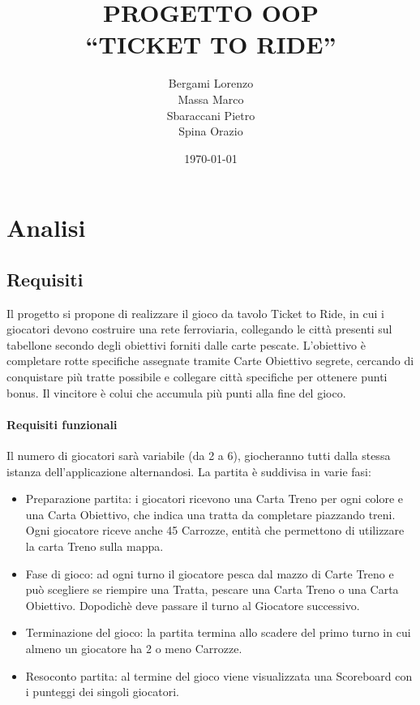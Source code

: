 \documentclass[a4paper,12pt]{report}
\title{PROGETTO OOP\\``TICKET TO RIDE''}
\author{Bergami Lorenzo\\
Massa Marco\\
Sbaraccani Pietro\\
Spina Orazio}
\date{\today}
\begin{document}
\maketitle

\tableofcontents

\chapter{Analisi}


\section{Requisiti}
Il progetto si propone di realizzare il gioco da tavolo Ticket to Ride, in cui i giocatori devono costruire una rete ferroviaria, collegando le città presenti sul tabellone secondo degli obiettivi forniti dalle carte pescate. L'obiettivo è completare rotte specifiche assegnate tramite Carte Obiettivo segrete, cercando di conquistare più tratte possibile e collegare città specifiche per ottenere punti bonus. Il vincitore è colui che accumula più punti alla fine del gioco. 

\subsubsection{Requisiti funzionali}
Il numero di giocatori sarà variabile (da 2 a 6), giocheranno tutti dalla stessa istanza dell'applicazione alternandosi. 
La partita è suddivisa in varie fasi:
\begin{itemize}
\item Preparazione partita: i giocatori ricevono una Carta Treno per ogni colore e una Carta Obiettivo, che indica una tratta da completare piazzando treni. Ogni giocatore riceve anche 45 Carrozze, entità che permettono di utilizzare la carta Treno sulla mappa.
\item Fase di gioco: ad ogni turno il giocatore pesca dal mazzo di Carte Treno e può scegliere se riempire una Tratta, pescare una Carta Treno o una Carta Obiettivo. Dopodichè deve passare il turno al Giocatore successivo.
\item Terminazione del gioco: la partita termina allo scadere del primo turno in cui almeno un giocatore ha 2 o meno Carrozze. 
\item Resoconto partita: al termine del gioco viene visualizzata una Scoreboard con i punteggi dei singoli giocatori.
\end{itemize}
\end{document}
